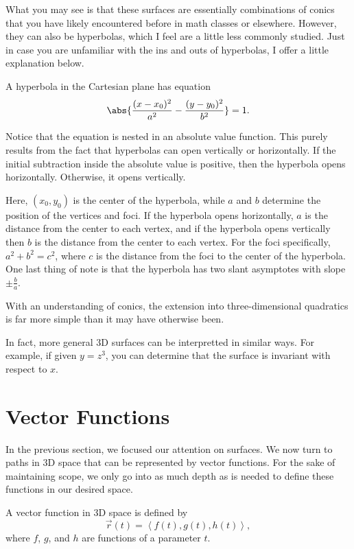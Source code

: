 What you may see is that these surfaces are essentially combinations of conics that you have likely encountered before in math classes or elsewhere. However, they can also be hyperbolas, which I feel are a little less commonly studied. Just in case you are unfamiliar with the ins and outs of hyperbolas, I offer a little explanation below.

\begin{definition}
    A hyperbola in the Cartesian plane has equation
    \[\abs{\frac{(x - x_{0})^{2}}{a^{2}} - \frac{(y - y_{0})^{2}}{b^{2}}} = 1.\]
\end{definition}

Notice that the equation is nested in an absolute value function. This purely results from the fact that hyperbolas can open vertically or horizontally. If the initial subtraction inside the absolute value is positive, then the hyperbola opens horizontally. Otherwise, it opens vertically.

Here, $(x_{0}, y_{0})$ is the center of the hyperbola, while $a$ and $b$ determine the position of the vertices and foci. If the hyperbola opens horizontally, $a$ is the distance from the center to each vertex, and if the hyperbola opens vertically then $b$ is the distance from the center to each vertex. For the foci specifically, $a^{2} + b^{2} = c^{2}$, where $c$ is the distance from the foci to the center of the hyperbola. One last thing of note is that the hyperbola has two slant asymptotes with slope $\pm\frac{b}{a}$.

With an understanding of conics, the extension into three-dimensional quadratics is far more simple than it may have otherwise been.

In fact, more general 3D surfaces can be interpretted in similar ways. For example, if given $y = z^{3}$, you can determine that the surface is invariant with respect to $x$.

\section{Vector Functions}

In the previous section, we focused our attention on surfaces. We now turn to paths in 3D space that can be represented by vector functions. For the sake of maintaining scope, we only go into as much depth as is needed to define these functions in our desired space.

\begin{definition}
    A vector function in 3D space is defined by
    \[\vec{r}(t) = \left<f(t), g(t), h(t)\right>,\]
    where $f$, $g$, and $h$ are functions of a parameter $t$.
\end{definition}

